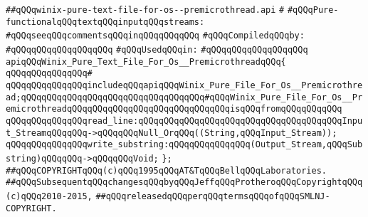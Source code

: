\label{src/lib/std/src/io/winix-pure-text-file-for-os--premicrothread.api}
\verb|##qQQqwinix-pure-text-file-for-os--premicrothread.api|\newline
\verb|#|\newline
\verb|#qQQqPure-functionalqQQqtextqQQqinputqQQqstreams:|\newline
\verb|#qQQqseeqQQqcommentsqQQqinqQQqqQQqqQQq|\newline
\newline
\verb|#qQQqCompiledqQQqby:|\newline
\verb|#qQQqqQQqqQQqqQQqqQQq|\newline
\newline
\verb|#qQQqUsedqQQqin:|\newline
\verb|#qQQqqQQqqQQqqQQqqQQq|\newline
\newline
\newline
\verb|apiqQQqWinix_Pure_Text_File_For_Os__PremicrothreadqQQq{|\newline
\verb|qQQqqQQqqQQqqQQq#|\newline
\verb|qQQqqQQqqQQqqQQqincludeqQQqapiqQQqWinix_Pure_File_For_Os__Premicrothread;qQQqqQQqqQQqqQQqqQQqqQQqqQQqqQQqqQQq#qQQqWinix_Pure_File_For_Os__PremicrothreadqQQqqQQqqQQqqQQqqQQqqQQqqQQqqQQqisqQQqfromqQQqqQQqqQQq|\newline
\newline
\verb|qQQqqQQqqQQqqQQqread_line:qQQqqQQqqQQqqQQqqQQqqQQqqQQqqQQqqQQqqQQqInput_StreamqQQqqQQq->qQQqqQQqNull_OrqQQq((String,qQQqInput_Stream));|\newline
\newline
\verb|qQQqqQQqqQQqqQQqwrite_substring:qQQqqQQqqQQqqQQq(Output_Stream,qQQqSubstring)qQQqqQQq->qQQqqQQqVoid;|\newline
\verb|};|\newline
\newline
\newline
\newline
\verb|##qQQqCOPYRIGHTqQQq(c)qQQq1995qQQqAT&TqQQqBellqQQqLaboratories.|\newline
\verb|##qQQqSubsequentqQQqchangesqQQqbyqQQqJeffqQQqProtheroqQQqCopyrightqQQq(c)qQQq2010-2015,|\newline
\verb|##qQQqreleasedqQQqperqQQqtermsqQQqofqQQqSMLNJ-COPYRIGHT.|\newline

